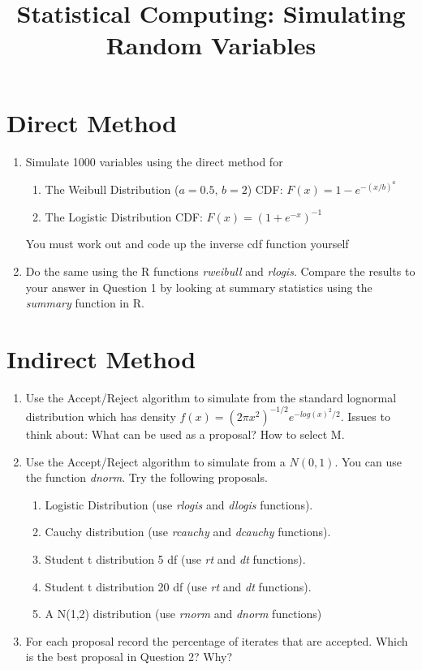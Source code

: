 \documentclass{article}
\begin{document}
\title{Statistical Computing: Simulating Random Variables}
\date{}
\maketitle
\section*{Direct Method}
\begin{enumerate}
\item Simulate 1000 variables using the direct method for
\begin{enumerate}
\item The Weibull Distribution ($a=0.5,\,b=2$) CDF: $F(x)=1-e^{-(x/b)^a}$
\item The Logistic Distribution CDF: $F(x)=(1+e^{-x})^{-1}$
\end{enumerate}
You must work out and code up the inverse cdf function yourself
\item Do the same using the R functions {\em rweibull} and {\em rlogis}.  Compare the results to your answer in Question 1 by looking at summary statistics using the {\em summary} function in R.
\end{enumerate}
\section*{Indirect Method}
\begin{enumerate}
\item Use the Accept/Reject algorithm to simulate from the standard lognormal distribution which has density $f(x)=(2\pi x^2)^{-1/2}e^{-log(x)^2/2}$.  Issues to think about:  What can be used as a proposal?  How to select M.
\item Use the Accept/Reject algorithm to simulate from a $N(0,1)$.  You can use the function {\em dnorm}. Try the following proposals.
\begin{enumerate}
\item Logistic Distribution (use {\em rlogis} and {\em dlogis} functions).
\item Cauchy distribution (use {\em rcauchy} and {\em dcauchy} functions).
\item Student t distribution 5 df (use {\em rt} and {\em dt} functions).
\item Student t distribution 20 df (use {\em rt} and {\em dt} functions).
\item A N(1,2) distribution (use {\em rnorm} and {\em dnorm} functions)
\end{enumerate}
\item For each proposal record the percentage of iterates that are accepted.  Which is the best proposal in Question 2? Why?
\end{enumerate}
\end{document}
